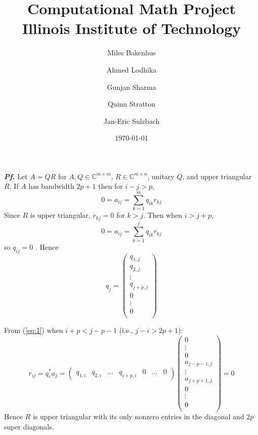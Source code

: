 \documentclass{report}
\title{Computational Math Project\\
  {\large Illinois Institute of Technology}
}
\author{
  Miles Bakenhus 
  \and
  Ahmed Lodhika 
  \and
  Gunjan Sharma 
  \and
  Quinn Stratton 
  \and
  Jan-Eric Sulzbach 
}
\date{\today}
\numberwithin{pic}{section}
\numberwithin{lem}{section}
\numberwithin{thm}{section}
\numberwithin{cor}{section}
\theoremstyle{definition}
\numberwithin{ex}{section}
\numberwithin{defn}{section}
\theoremstyle{definition}
\theoremstyle{remark}
\newcommand{\C}{\ensuremath{\mathbb{C}}} %
\begin{document}
\fancyhead[l]{}
\fancyhead[c]{}
\fancyhead[r]{}
\textbf{\emph{Pf.}} 
Let $A = QR$ for $A,Q \in \C^{m \times m}$, $R \in \C^{m \times n}$, unitary $Q$, and upper triangular $R$. If $A$ has bandwidth $2p +1$ then for $i - j > p$, 
	$$ 0 = a_{ij} = \sum_{k = 1}^{m} q_{ik}r_{kj}$$
Since $R$ is upper triangular, $r_{kj} = 0$ for $k > j$. Then when $i > j + p$,
	$$ 0 = a_{ij} = \sum_{k = 1}^{j} q_{ik}r_{kj}$$
so $q_{ij} = 0$ . Hence 
	\begin{equation} \label{eq:1}
		q_{j} = \begin{pmatrix} 
			q_{1,j} \\
			q_{2,j} \\
			\vdots \\
			q_{j+p,j} \\
			0 \\
			\vdots \\
			0 \\
		\end{pmatrix}
	\end{equation}

From (\ref{eq:1}) when $i+p < j - p -1$ (i.e., $j - i > 2p + 1$):
	$$
		r_{ij} = q_i^* a_j =\begin{pmatrix}
			q_{1,i} & q_{2,i} &	\dots & q_{i+p,i} & 0 & \dots &	0 
		\end{pmatrix}\begin{pmatrix} 
		0 \\
		\vdots \\
		0 \\
		a_{j-p-1,j} \\
		\vdots \\
		a_{j+p+1,j} \\
		0 \\
		\vdots \\
		0 \\
		\end{pmatrix} = 0
	$$
Hence $R$ is upper triangular with its only nonzero entries in the diagonal and $2p$ super diagonals.
\end{document}
